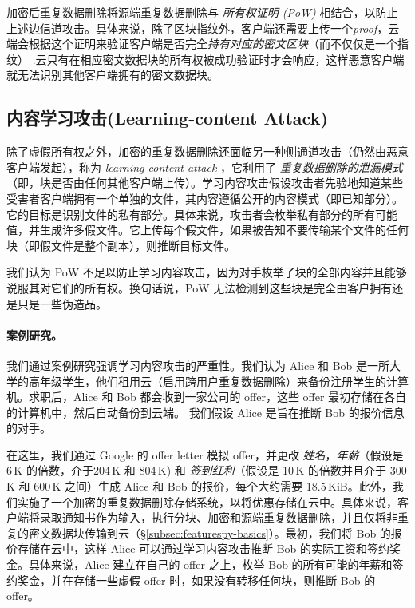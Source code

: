 加密后重复数据删除将源端重复数据删除与 {\em 所有权证明 (PoW)} \cite{halevi11} 相结合，以防止上述边信道攻击。具体来说，除了区块指纹外，客户端还需要上传一个{\em proof}，云端会根据这个证明来验证客户端是否完全{\em 持有对应的密文区块}（而不仅仅是一个指纹） .云只有在相应密文数据块的所有权被成功验证时才会响应，这样恶意客户端就无法识别其他客户端拥有的密文数据块。

\subsection{内容学习攻击(Learning-content Attack)}
\label{subsec:featurespy-attack}
除了虚假所有权之外，加密的重复数据删除还面临另一种侧通道攻击（仍然由恶意客户端发起），称为 {\em learning-content attack} \cite{harnik10, zuo2018mitigating}，它利用了 {\em 重复数据删除的泄漏模式}（即，块是否由任何其他客户端上传）。学习内容攻击假设攻击者先验地知道某些受害者客户端拥有一个单独的文件，其内容遵循公开的内容模式（即已知部分）。它的目标是识别文件的私有部分。具体来说，攻击者会枚举私有部分的所有可能值，并生成许多假文件。它上传每个假文件，如果被告知不要传输某个文件的任何块（即假文件是整个副本），则推断目标文件。

我们认为 PoW \cite{halevi11} 不足以防止学习内容攻击，因为对手枚举了块的全部内容并且能够说服其对它们的所有权。换句话说，PoW 无法检测到这些块是完全由客户拥有还是只是一些伪造品。

\paragraph*{案例研究。}
我们通过案例研究强调学习内容攻击的严重性。我们认为 Alice 和 Bob 是一所大学的高年级学生，他们租用云（启用跨用户重复数据删除）来备份注册学生的计算机。求职后，Alice 和 Bob 都会收到一家公司的 offer，这些 offer 最初存储在各自的计算机中，然后自动备份到云端。
我们假设 Alice 是旨在推断 Bob 的报价信息的对手。


在这里，我们通过 Google 的 offer letter \cite{google_offer} 模拟 offer，并更改 \textit{姓名}，\textit{年薪}（假设是 6\,K \cite{harnik10} 的倍数，介于204\,K 和 804\,K) 和 \textit{签到红利}（假设是 10\,K 的倍数并且介于 300\,K 和 600\,K 之间）生成 Alice 和 Bob 的报价，每个大约需要 18.5\,KiB。此外，我们实施了一个加密的重复数据删除存储系统，以将优惠存储在云中。具体来说，客户端将录取通知书作为输入，执行分块、加密和源端重复数据删除，并且仅将非重复的密文数据块传输到云（\S\ref{subsec:featurespy-basics}）。最初，我们将 Bob 的报价存储在云中，这样 Alice 可以通过学习内容攻击推断 Bob 的实际工资和签约奖金。具体来说，Alice 建立在自己的 offer 之上，枚举 Bob 的所有可能的年薪和签约奖金，并在存储一些虚假 offer 时，如果没有转移任何块，则推断 Bob 的 offer。


